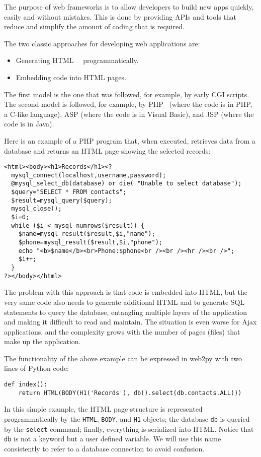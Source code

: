 \documentclass[justified,sixbynine,notoc]{tufte-book}
\def\ft{\small\tt}
\begin{document}
\begin{fullwidth}
The purpose of web frameworks is to allow developers to build new apps quickly, easily and without mistakes.
This is done by providing APIs and tools that reduce and simplify the amount of coding that is required.

The two classic approaches for developing web applications are:
\begin{itemize}
\item Generating HTML~\cite{html-w}~\cite{html-o}  programmatically.

\item Embedding code into HTML pages.
\end{itemize}

The first model is the one that was followed, for example, by early CGI scripts.
The second model is followed, for example, by PHP~\cite{php}
(where the code is in PHP, a C-like language), ASP (where the code is in Visual Basic), and JSP (where the code is in Java).

Here is an example of a PHP program that, when executed, retrieves data from a database and
returns an HTML page showing the selected records:
\begin{lstlisting}[keywords={}]
<html><body><h1>Records</h1><?
  mysql_connect(localhost,username,password);
  @mysql_select_db(database) or die( "Unable to select database");
  $query="SELECT * FROM contacts";
  $result=mysql_query($query);
  mysql_close();
  $i=0;
  while ($i < mysql_numrows($result)) {
    $name=mysql_result($result,$i,"name");
    $phone=mysql_result($result,$i,"phone");
    echo "<b>$name</b><br>Phone:$phone<br /><br /><hr /><br />";
    $i++;
  }
?></body></html>
\end{lstlisting}

The problem with this approach is that code is embedded into HTML, but the very same code also needs to
generate additional HTML and to generate SQL statements
to query the database, entangling multiple layers of
the application and making it difficult to read and maintain. The situation is
even worse for Ajax applications, and the complexity grows with the number of pages (files) that make up
the application.

The functionality of the above example can be expressed in web2py with two lines of Python code:
\begin{lstlisting}
def index():
    return HTML(BODY(H1('Records'), db().select(db.contacts.ALL)))
\end{lstlisting}

In this simple example, the HTML page structure is represented programmatically by the {\ft HTML}, {\ft BODY}, and {\ft H1} objects; the database {\ft db} is queried by the {\ft select} command; finally, everything
is serialized into HTML.
Notice that {\ft db} is not a keyword but a user defined variable. We will use this name consistently to refer to a database connection to avoid confusion.


\end{fullwidth}
\end{document}
